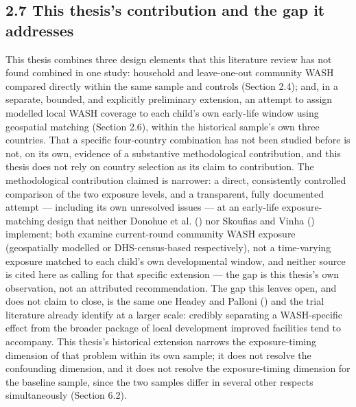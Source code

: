 \subsection*{2.7 This thesis's contribution and the gap it addresses}

This thesis combines three design elements that this literature review has not found combined in one study: household and leave-one-out community WASH compared directly within the same sample and controls (Section 2.4); and, in a separate, bounded, and explicitly preliminary extension, an attempt to assign modelled local WASH coverage to each child's own early-life window using geospatial matching (Section 2.6), within the historical sample's own three countries. That a specific four-country combination has not been studied before is not, on its own, evidence of a substantive methodological contribution, and this thesis does not rely on country selection as its claim to contribution. The methodological contribution claimed is narrower: a direct, consistently controlled comparison of the two exposure levels, and a transparent, fully documented attempt --- including its own unresolved issues --- at an early-life exposure-matching design that neither Donohue et al. (\citeyear{Donohue2023}) nor Skoufias and Vinha (\citeyear{SkoufiasVinha2026}) implement; both examine current-round community WASH exposure (geospatially modelled or DHS-census-based respectively), not a time-varying exposure matched to each child's own developmental window, and neither source is cited here as calling for that specific extension --- the gap is this thesis's own observation, not an attributed recommendation. The gap this leaves open, and does not claim to close, is the same one Headey and Palloni (\citeyear{HeadeyPalloni2019}) and the trial literature \parencite{Cumming2019} already identify at a larger scale: credibly separating a WASH-specific effect from the broader package of local development improved facilities tend to accompany. This thesis's historical extension narrows the exposure-timing dimension of that problem within its own sample; it does not resolve the confounding dimension, and it does not resolve the exposure-timing dimension for the baseline sample, since the two samples differ in several other respects simultaneously (Section 6.2).
